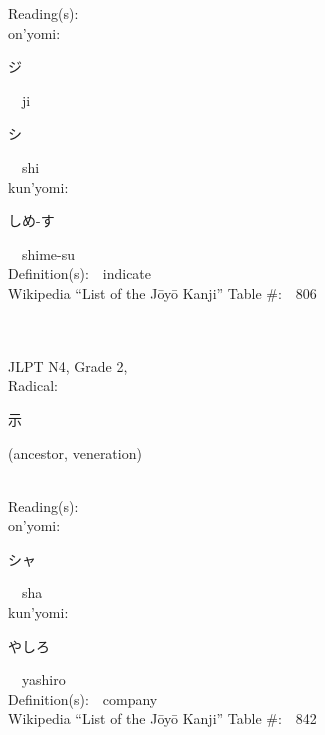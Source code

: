 \begin{multicols}{2}
Reading(s):\ \ \\
{\hspace*{1em}}on'yomi:\ \ \\
{\hspace*{2em}}{\begin{CJK}{UTF8}{min} ジ \end{CJK}}\ \ ji\ \ \\
{\hspace*{2em}}{\begin{CJK}{UTF8}{min} シ \end{CJK}}\ \ shi\ \ \\
{\hspace*{1em}}kun'yomi:\ \ \\
{\hspace*{2em}}{\begin{CJK}{UTF8}{min} しめ-す \end{CJK}}\ \ shime-su\ \ \\
Definition(s):\ \ indicate \\
Wikipedia ``List of the J\=oy\=o Kanji'' Table \#:\ \ 806 \\
\ \ \\
{\fontsize{34pt}{40pt}  }\ \ \\  %
{JLPT N4, Grade 2, \\Radical:\ \ {\begin{CJK}{UTF8}{min} 示 \end{CJK}} (ancestor, veneration) } \\
Reading(s):\ \ \\
{\hspace*{1em}}on'yomi:\ \ \\
{\hspace*{2em}}{\begin{CJK}{UTF8}{min} シャ \end{CJK}}\ \ sha\ \ \\
{\hspace*{1em}}kun'yomi:\ \ \\
{\hspace*{2em}}{\begin{CJK}{UTF8}{min} やしろ \end{CJK}}\ \ yashiro\ \ \\
Definition(s):\ \ company \\
Wikipedia ``List of the J\=oy\=o Kanji'' Table \#:\ \ 842 \\

\end{multicols}
